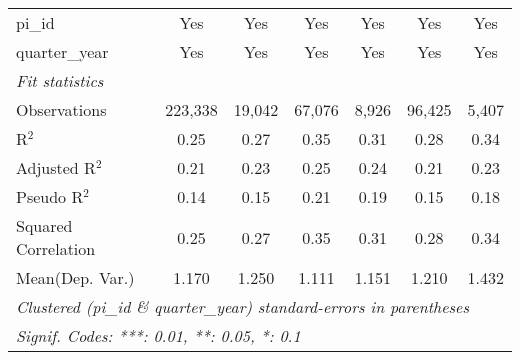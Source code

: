 \begin{tabular}{lcccccc}
   pi\_id                                                     & Yes            & Yes             & Yes           & Yes          & Yes           & Yes\\  
   quarter\_year                                              & Yes            & Yes             & Yes           & Yes          & Yes           & Yes\\  
   \midrule
   \emph{Fit statistics}\\
   Observations                                               & 223,338        & 19,042          & 67,076        & 8,926        & 96,425        & 5,407\\  
   R$^2$                                                      & 0.25           & 0.27            & 0.35          & 0.31         & 0.28          & 0.34\\  
   Adjusted R$^2$                                             & 0.21           & 0.23            & 0.25          & 0.24         & 0.21          & 0.23\\  
   Pseudo R$^2$                                               & 0.14           & 0.15            & 0.21          & 0.19         & 0.15          & 0.18\\  
   Squared Correlation                                        & 0.25           & 0.27            & 0.35          & 0.31         & 0.28          & 0.34\\  
Mean(Dep. Var.) & 1.170 & 1.250 & 1.111 & 1.151 & 1.210 & 1.432 \\
   \midrule \midrule
   \multicolumn{7}{l}{\emph{Clustered (pi\_id \& quarter\_year) standard-errors in parentheses}}\\
   \multicolumn{7}{l}{\emph{Signif. Codes: ***: 0.01, **: 0.05, *: 0.1}}\\
\end{tabular}
\par\endgroup
